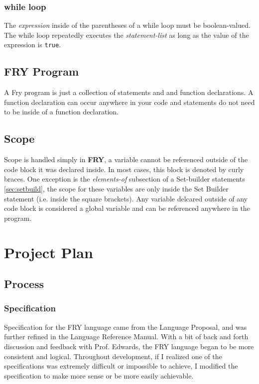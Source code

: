 \documentclass{article}
\begin{document}
\subsubsection{while loop}

The \emph{expression} inside of the parentheses of a while loop must be boolean-valued. The while loop repeatedly executes the \emph{statement-list} as long as the value of the expression is \texttt{true}.

\subsection{FRY Program}

A Fry program is just a collection of statements and and function declarations. A function declaration can occur anywhere in your code and statements do not need to be inside of a function declaration.


\subsection{Scope}
Scope is handled simply in \textbf{FRY}, a variable cannot be referenced outside of the code block it was declared inside. In most cases, this block is denoted by curly braces. One exception is the \emph{elements-of} subsection of a Set-builder statements \ref{sec:setbuild}, the scope for these variables are only inside the Set Builder statement (i.e. inside the square brackets). Any variable delcared outside of any code block is considered a global variable and can be referenced anywhere in the program.


\section{Project Plan}
\subsection{Process}
\subsubsection{Specification}
Specification for the FRY language came from the Language Proposal, and was further refined in the Language Reference Manual. With a bit of back and forth discussion and feedback with Prof. Edwards, the FRY language began to be more consistent and logical. Throughout development, if I realized one of the specifications was extremely difficult or impossible to achieve, I modified the specification to make more sense or be more easily achievable.
\end{document}
